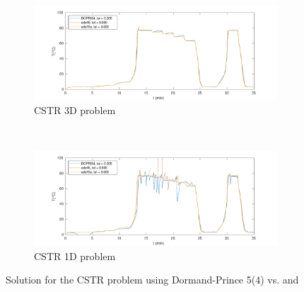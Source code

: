 \begin{figure}[H]
    \centering
    \begin{subfigure}{0.8\linewidth}
        \centering
        \includegraphics[width=1\linewidth]{images/7/7_6_3D.pdf} 
        \caption{CSTR 3D problem}
    \end{subfigure} \\
    \begin{subfigure}{0.8\linewidth}
        \centering
        \includegraphics[width=1\linewidth]{images/7/7_6_1D.pdf}
        \caption{CSTR 1D problem}
    \end{subfigure}
    \caption{Solution for the CSTR problem using Dormand-Prince 5(4) vs.  and }
    \label{7_6_3D_1D}
\end{figure}

